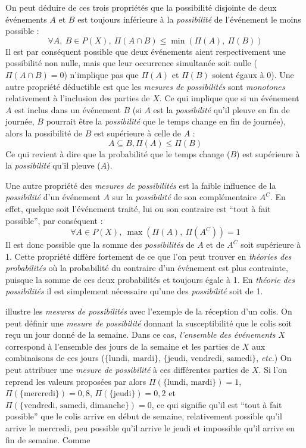 On peut déduire de ces trois propriétés \autocite{Bouchon-Meunier2007}
que la possibilité disjointe de deux événements \(A\) et \(B\) est
toujours inférieure à la \emph{possibilité} de l'événement le moins
possible :
%
\begin{equation}
  ∀ A,\ B ∈ P(X),\ Π(A ∩ B) ≤ \min(Π(A),\ Π(B))
\end{equation}
%
Il est par conséquent possible que deux événements aient
respectivement une possibilité non nulle, mais que leur occurrence
simultanée soit nulle (\( Π(A ∩ B) = 0\)) n'implique pas que \(Π(A)\)
et \(Π(B)\) soient égaux à 0). Une autre propriété déductible est que
les \emph{mesures de possibilités} sont \emph{monotones} relativement
à l'inclusion des parties de \(X\). Ce qui implique que si un
événement \(A\) est inclus dans un événement \(B\) (\eg si \(A\) est
la \emph{possibilité} qu'il pleuve en fin de journée, \(B\) pourrait
être la \emph{possibilité} que le temps change en fin de journée),
alors la possibilité de \(B\) est supérieure à celle de \(A\) :
%
\begin{equation}
  A \subseteq B, Π(A) ≤ Π(B)
\end{equation}
%
Ce qui revient à dire que la probabilité que le temps change (\(B\))
est supérieure à la \emph{possibilité} qu'il pleuve (\(A\)).

Une autre propriété des \emph{mesures de possibilités} est la faible
influence de la \emph{possibilité} d'un événement \(A\) sur la
\emph{possibilité} de son complémentaire \(A^C\). En effet, quelque
soit l’événement traité, lui ou son contraire est \enquote{tout à fait
  possible}, par conséquent :
%
\begin{equation}
  ∀ A ∈ P(X),\ \max(Π(A),\ Π(A^C)) = 1  
\end{equation}
%
Il est donc possible que la somme des \emph{possibilités} de \(A\) et
de \(A^C\) soit supérieure à 1. Cette propriété diffère fortement de
ce que l'on peut trouver en \emph{théories des probabilités} où la
probabilité du contraire d'un événement est plus contrainte, puisque
la somme de ces deux probabilités et toujours égale à 1. En
\emph{théorie des possibilités} il est simplement nécessaire qu'une
des \emph{possibilité} soit de 1.

\textcite{Bouchon-Meunier1995} illustre les \emph{mesures de
  possibilités} avec l'exemple de la réception d'un colis. On peut
définir une \emph{mesure de possibilité} donnant la susceptibilité que
le colis soit reçu un jour donné de la semaine. Dans ce cas,
\emph{l'ensemble des événements} \(X\) correspond à l'ensemble des
jours de la semaine et les parties de \(X\) aux combinaisons de ces
jours (\eg \(\{\text{lundi},\ \text{mardi}\}\),
\(\{\text{jeudi, vendredi, samedi}\}\), \emph{etc.})  On peut
attribuer une \emph{mesure de possibilité} à ces différentes parties
de \(X\). Si l'on reprend les valeurs proposées par
\textcite{Bouchon-Meunier1995} alors
\(\Pi(\{\text{lundi, mardi}\})=1\), \(\Pi(\{\text{mercredi}\})=0,8\),
\(\Pi(\{\text{jeudi}\})=0,2\) et
\(\Pi(\{\text{vendredi, samedi, dimanche}\})=0\), ce qui signifie
qu'il est \enquote{tout à fait possible} que le colis arrive en début
de semaine, relativement possible qu'il arrive le mercredi, peu
possible qu'il arrive le jeudi et impossible qu'il arrive en fin de
semaine. Comme

